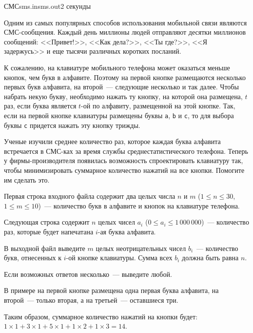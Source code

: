 \begin{problem}{СМС}{sms.in}{sms.out}{2 секунды}


Одним из самых популярных способов использования мобильной связи являются СМС-сообщения. Каждый день миллионы людей отправляют десятки миллионов сообщений: <<Привет!>>, <<Как дела?>>, <<Ты где?>>, <<Я 
задержусь>> и еще тысячи различных коротких посланий.

К сожалению, на клавиатуре мобильного телефона может оказаться меньше кнопок, чем букв в алфавите. Поэтому на первой кнопке размещаются несколько первых букв алфавита, на второй~--- следующие несколько и так 
далее. Чтобы набрать некую букву, необходимо нажать ту кнопку, на которой она размещена, $t$ раз, если буква является $t$-ой по алфавиту, размещенной на этой кнопке. Так, если на первой кнопке клавиатуры 
размещены буквы \texttt{a}, \texttt{b} и \texttt{c}, то для выбора буквы \texttt{c} придется нажать эту кнопку трижды.

Ученые изучили среднее количество раз, которое каждая буква алфавита встречается в СМС-ках за время службы среднестатистического телефона. Теперь у фирмы-производителя появилась возможность спроектировать 
клавиатуру так, чтобы минимизировать суммарное количество нажатий на все кнопки. Помогите им сделать это.

\InputFile
Первая строка входного файла содержит два целых числа $n$ и $m$ ($1 \le n \le 30$, $1 \le m \le 10$)~--- количество букв в алфавите и кнопок на клавиатуре телефона. 

Следующая строка содержит $n$ целых чисел $a_i$ ($0 \le a_i \le 1{\,}000{\,}000$)~--- количество раз, которые будет напечатана $i$-ая буква алфавита.

\OutputFile
В выходной файл выведите $m$ целых неотрицательных чисел $b_i$~--- количество букв, отнесенных к $i$-ой кнопке клавиатуры. Сумма всех $b_i$ должна быть равна $n$. 

Если возможных ответов несколько~--- выведите любой.

\Examples
\begin{example}%
%
\end{example}

\Note
В примере на первой кнопке размещена одна первая буква алфавита, на второй~--- только вторая, а на третьей~--- оставшиеся три.

Таким образом, суммарное количество нажатий на кнопки будет:
$1 \times 1 + 3 \times 1 + 5 \times 1 + 1 \times 2 + 1 \times 3 = 14$.

\end{problem}
